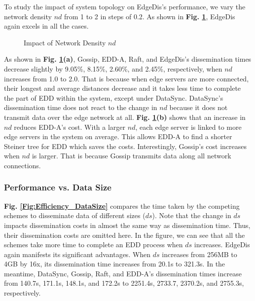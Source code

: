 \documentclass[10pt,journal,compsoc]{IEEEtran}
\begin{document}
To study the impact of system topology on EdgeDis's performance, we vary the network density $nd$ from 1 to 2 in steps of 0.2. As shown in \textbf{Fig. \ref{fig:NetworkDensity}}, EdgeDis again excels in all the cases.


\begin{figure}
    \centering
    \vspace{-1em}
    \caption{Impact of Network Density $nd$}
    \label{fig:NetworkDensity}
\end{figure}


As shown in \textbf{Fig. \ref{fig:NetworkDensity}(a)}, Gossip, EDD-A, Raft, and EdgeDis's dissemination times decrease slightly by 9.05\%, 8.15\%, 2.60\%, and 2.45\%, respectively, when $nd$ increases from 1.0 to 2.0. That is because when edge servers are more connected, their longest and average distances decrease and it takes less time to complete the part of EDD within the system, except under DataSync. DataSync's dissemination time does not react to the change in $nd$ because it does not transmit data over the edge network at all. \textbf{Fig. \ref{fig:NetworkDensity}(b)} shows that an increase in $nd$ reduces EDD-A's cost. With a larger $nd$, each edge server is linked to more edge servers in the system on average. This allows EDD-A to find a shorter Steiner tree for EDD which saves the costs. Interestingly, Gossip's cost increases when $nd$ is larger. That is because Gossip transmits data along all network connections.


\subsubsection{Performance vs. Data Size}

\textbf{Fig. \ref{Fig:Efficiency_DataSize}} compares the time taken by the competing schemes to disseminate data of different sizes ($ds$). Note that the change in $ds$ impacts dissemination costs in almost the same way as dissemination time. Thus, their dissemination costs are omitted here. In the figure, we can see that all the schemes take more time to complete an EDD process when $ds$ increases. EdgeDis again manifests its significant advantages. When $ds$ increases from 256MB to 4GB by 16x, its dissemination time increases from 20.1s to 321.3s. In the meantime, DataSync, Gossip, Raft, and EDD-A's dissemination times increase from 140.7s, 171.1s, 148.1s, and 172.2s to 2251.4s, 2733.7, 2370.2s, and 2755.3s, respectively.
\end{document}
